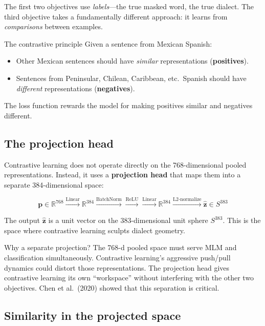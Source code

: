 \documentclass[11pt,a4paper]{article}
\theoremstyle{definition}
\begin{document}
The first two objectives use \emph{labels}---the true masked word, the
true dialect. The third objective takes a fundamentally different
approach: it learns from \emph{comparisons} between examples.

\begin{keyidea}{The contrastive principle}
Given a sentence from Mexican Spanish:
\begin{itemize}[nosep]
  \item Other Mexican sentences should have \emph{similar}
        representations (\textbf{positives}).
  \item Sentences from Peninsular, Chilean, Caribbean, etc.\ Spanish
        should have \emph{different} representations
        (\textbf{negatives}).
\end{itemize}
The loss function rewards the model for making positives similar and
negatives different.
\end{keyidea}

\subsection{The projection head}

Contrastive learning does not operate directly on the 768-dimensional
pooled representations. Instead, it uses a \textbf{projection head}
that maps them into a separate 384-dimensional space:

\[
\mathbf{p} \in \mathbb{R}^{768}
\xrightarrow{\text{Linear}} \mathbb{R}^{384}
\xrightarrow{\text{BatchNorm}}
\xrightarrow{\text{ReLU}}
\xrightarrow{\text{Linear}} \mathbb{R}^{384}
\xrightarrow{\text{L2-normalize}} \hat{\mathbf{z}} \in S^{383}
\]

The output $\hat{\mathbf{z}}$ is a unit vector on the 383-dimensional
unit sphere $S^{383}$. This is the space where contrastive learning
sculpts dialect geometry.

\begin{intuition}{Why a separate projection?}
The 768-d pooled space must serve MLM and classification
simultaneously. Contrastive learning's aggressive push/pull dynamics
could distort those representations. The projection head gives
contrastive learning its own ``workspace'' without interfering with
the other two objectives. Chen et al.\ (2020) showed that this
separation is critical.
\end{intuition}

\subsection{Similarity in the projected space}
\end{document}
